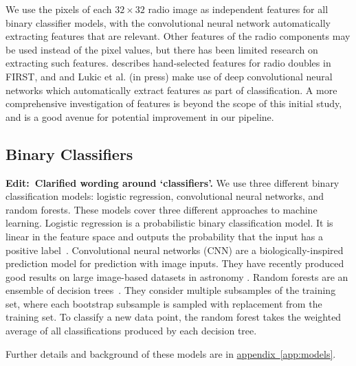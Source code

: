 \documentclass[fleqn,usenatbib,usedcolumn]{mnras}
\newcommand{\edit}[1]{{\bf Edit:~{#1}}}
\newcommand{\aref}[1]{\hyperref[#1]{appendix~\ref{#1}}}
\begin{document}
    We use the pixels of each $32 \times 32$ radio image as independent features for all binary classifier models, with the convolutional neural network automatically extracting features that are relevant. Other features of the radio components may be used instead of the pixel values, but there has been limited research on extracting such features. \citet{proctor06} describes hand-selected features for radio doubles in FIRST, and \citet{aniyan17cnn} and Lukic et al. (in press) make use of deep convolutional neural networks which automatically extract features as part of classification. A more comprehensive investigation of features is beyond the scope of this initial study, and is a good avenue for potential improvement in our pipeline.

  \subsection{Binary Classifiers}\label{sec:classifiers}

    \edit{Clarified wording around `classifiers'.} We use three different binary classification models: logistic regression, convolutional neural networks, and random forests. These models cover three different approaches to machine learning. Logistic regression is a probabilistic binary classification model. It is linear in the feature space and outputs the probability that the input has a positive label~\citep[Chap. 4]{bishop06ml}. Convolutional neural networks (CNN) are a biologically-inspired prediction model for prediction with image inputs. They have recently produced good results on large image-based datasets in astronomy \citep[e.g.][Lukic et al. in press]{dieleman15cnn}. Random forests are an ensemble of decision trees~\citep{breiman01random-forest}. They consider multiple subsamples of the training set, where each bootstrap subsample is sampled with replacement from the training set. To classify a new data point, the random forest takes the weighted average of all classifications produced by each decision tree.

    Further details and background of these models are in \aref{app:models}.
\end{document}
